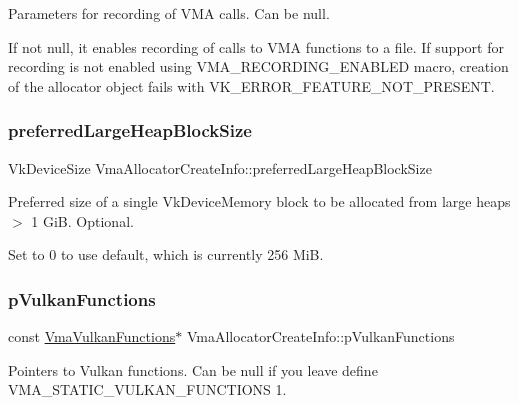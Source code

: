 Parameters for recording of V\+MA calls. Can be null. 

If not null, it enables recording of calls to V\+MA functions to a file. If support for recording is not enabled using {\ttfamily V\+M\+A\+\_\+\+R\+E\+C\+O\+R\+D\+I\+N\+G\+\_\+\+E\+N\+A\+B\+L\+ED} macro, creation of the allocator object fails with {\ttfamily V\+K\+\_\+\+E\+R\+R\+O\+R\+\_\+\+F\+E\+A\+T\+U\+R\+E\+\_\+\+N\+O\+T\+\_\+\+P\+R\+E\+S\+E\+NT}. \mbox{\label{structVmaAllocatorCreateInfo_a8e4714298e3121cdd8b214a1ae7a637a}} 
\subsubsection{\texorpdfstring{preferred\+Large\+Heap\+Block\+Size}{preferredLargeHeapBlockSize}}
{\footnotesize\ttfamily Vk\+Device\+Size Vma\+Allocator\+Create\+Info\+::preferred\+Large\+Heap\+Block\+Size}



Preferred size of a single {\ttfamily Vk\+Device\+Memory} block to be allocated from large heaps $>$ 1 GiB. Optional. 

Set to 0 to use default, which is currently 256 MiB. \mbox{\label{structVmaAllocatorCreateInfo_a3dc197be3227da7338b1643f70db36bd}} 
\subsubsection{\texorpdfstring{p\+Vulkan\+Functions}{pVulkanFunctions}}
{\footnotesize\ttfamily const \hyperlink{structVmaVulkanFunctions}{Vma\+Vulkan\+Functions}$\ast$ Vma\+Allocator\+Create\+Info\+::p\+Vulkan\+Functions}



Pointers to Vulkan functions. Can be null if you leave define {\ttfamily V\+M\+A\+\_\+\+S\+T\+A\+T\+I\+C\+\_\+\+V\+U\+L\+K\+A\+N\+\_\+\+F\+U\+N\+C\+T\+I\+O\+NS 1}. 

